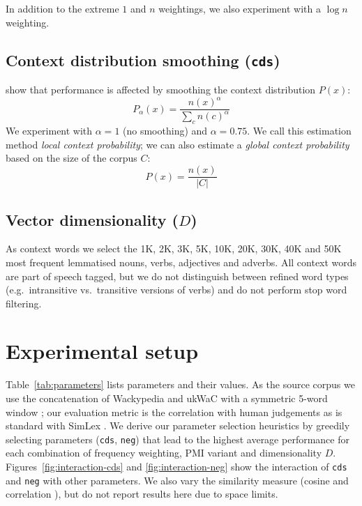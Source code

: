 \documentclass[11pt]{article}
\begin{document}
In addition to the extreme $1$ and $n$ weightings, we also experiment with a $\log n$ weighting.

\subsection{Context distribution smoothing (\texttt{cds})}
\label{sec:cont-distr-smooth}

 show that performance is affected by smoothing the context distribution $P(x)$:
%
\begin{equation}
  \label{eq:cds}
  P_{\alpha}(x) = \frac{n(x)^{\alpha}}{\sum_{c}n(c)^{\alpha}}
\end{equation}
%
We experiment with $\alpha=1$ (no smoothing) and $\alpha = 0.75$. We call this estimation method \emph{local context probability}; we can also estimate a \emph{global context probability} based on the size of the corpus $C$:
%
\begin{equation}
  \label{eq:cds-nan}
  P(x) = \frac{n(x)}{|C|}
\end{equation}

\subsection{Vector dimensionality ($D$)}
\label{sec:vect-dimens}

As context words we select the 1K, 2K, 3K, 5K, 10K, 20K, 30K, 40K and 50K most frequent lemmatised nouns, verbs, adjectives and adverbs. All context words are part of speech tagged, but we do not distinguish between refined word types (e.g.~intransitive vs.~transitive versions of verbs) and do not perform stop word filtering.



\section{Experimental setup}
\label{sec:lexical-experiments}

Table~\ref{tab:parameters} lists parameters and their values. As the source corpus we use the concatenation of Wackypedia and ukWaC \cite{Baroni2009} with a symmetric 5-word window \cite{milajevs-EtAl:2014:EMNLP2014}; our evaluation metric is the correlation with human judgements as is standard with SimLex \cite{hill2014simlex}. We derive our parameter selection heuristics by greedily selecting parameters (\texttt{cds}, \texttt{neg}) that lead to the highest average performance for each combination of frequency weighting, PMI variant and dimensionality $D$. Figures~\ref{fig:interaction-cds} and \ref{fig:interaction-neg} show the interaction of \texttt{cds} and \texttt{neg} with other parameters. We also vary the similarity measure (cosine and correlation  \cite{kiela-clark:2014:CVSC}), but do not report results here due to space limits.\footnotemark{}
\end{document}
